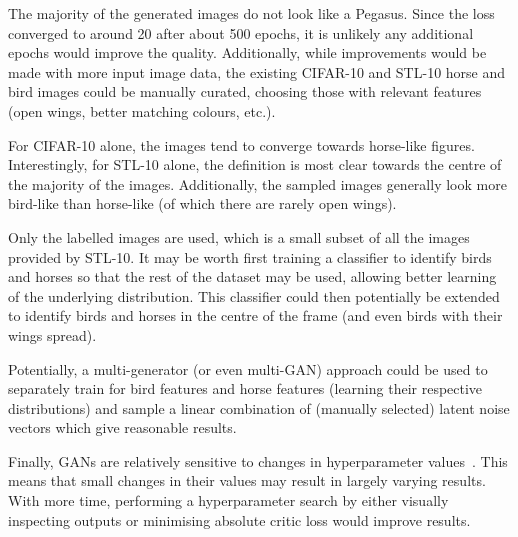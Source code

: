The majority of the generated images do not look like a Pegasus.
Since the loss converged to around 20 after about 500 epochs, it is unlikely any additional epochs would improve the quality.
Additionally, while improvements would be made with more input image data, the existing CIFAR-10 and STL-10 horse and bird images could be manually curated, choosing those with relevant features (open wings, better matching colours, etc.).

For CIFAR-10 alone, the images tend to converge towards horse-like figures.
Interestingly, for STL-10 alone, the definition is most clear towards the centre of the majority of the images.
Additionally, the sampled images generally look more bird-like than horse-like (of which there are rarely open wings).

Only the labelled images are used, which is a small subset of all the images provided by STL-10.
It may be worth first training a classifier to identify birds and horses so that the rest of the dataset may be used, allowing better learning of the underlying distribution.
This classifier could then potentially be extended to identify birds and horses in the centre of the frame (and even birds with their wings spread).

Potentially, a multi-generator (or even multi-GAN) approach could be used to separately train for bird features and horse features (learning their respective distributions) and sample a linear combination of (manually selected) latent noise vectors which give reasonable results.

Finally, GANs are relatively sensitive to changes in hyperparameter values~\cite{lucic2017gans}.
This means that small changes in their values may result in largely varying results.
With more time, performing a hyperparameter search by either visually inspecting outputs or minimising absolute critic loss would improve results.
